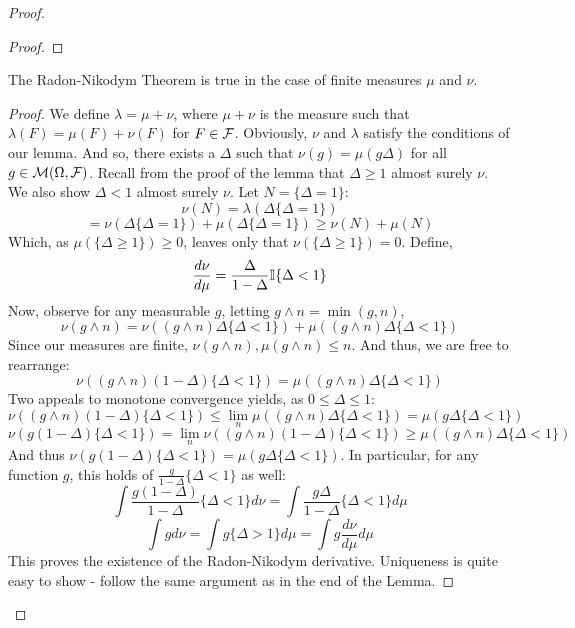 \begin{proof}
\begin{proof}
    \end{proof}

    \begin{lemma} 
        The Radon-Nikodym Theorem is true in the case of finite measures $\mu$ and $\nu$. 
    \end{lemma}

    \begin{proof} 
        We define $\lambda = \mu + \nu$, where $\mu + \nu$ is the measure such that 
        $\lambda(F) = \mu(F) + \nu(F)$ for $F \in \mathcal F$. Obviously, $\nu$ and $\lambda$ satisfy the 
        conditions of our lemma. And so, there exists a $\Delta$ such that $\nu(g) = \mu(g\Delta)$ for all 
        $g \in \mathcal M(\Omega, \mathcal F)$. Recall from the proof of the lemma that $\Delta \geq 1$ almost surely $\nu$. We also show 
        $\Delta < 1$ almost surely $\nu$. Let $N= \{\Delta = 1\}$:
        \[ \nu(N) = \lambda(\Delta\{\Delta = 1\}) \] 
        \[ = \nu(\Delta\{\Delta = 1\}) + \mu(\Delta\{\Delta = 1\}) \geq \nu(N) + \mu(N) \]
        Which, as $\mu(\{\Delta \geq 1\}) \geq 0$, leaves only that $\nu(\{\Delta \geq 1\}) = 0$. Define, 
        \[ \frac{d\nu}{d\mu} = \frac{\Delta}{1-\Delta}\mathbb I\{\Delta < 1\} \]
        Now, observe for any measurable $g$, letting $g \wedge n = \min(g,n)$, 
        \[ \nu(g \wedge n) = \nu((g \wedge n) \Delta \{\Delta < 1\}) + \mu((g \wedge n) \Delta \{\Delta < 1\}) \]
        Since our measures are finite, $\nu(g \wedge n), \mu(g \wedge n) \leq n$. And thus, we are free to rearrange:
        \[ \nu((g \wedge n) (1 - \Delta)\{\Delta < 1\}) = \mu((g \wedge n) \Delta\{\Delta < 1\}) \]
        Two appeals to monotone convergence yields, as $0 \leq \Delta \leq 1$:
        \[ \nu((g \wedge n) (1 - \Delta)\{\Delta < 1\}) \leq \lim_n \mu((g \wedge n) \Delta\{\Delta < 1\}) = \mu(g \Delta\{\Delta < 1\}) \]
        \[\nu(g(1-\Delta)\{\Delta < 1\}) =  \lim_n \nu((g \wedge n) (1 - \Delta)\{\Delta < 1\}) \geq \mu((g \wedge n) \Delta\{\Delta < 1\}) \]
        And thus $\nu(g(1-\Delta)\{\Delta < 1\}) = \mu(g\Delta\{\Delta < 1\})$. In particular, 
        for any function $g$, this holds of $\frac{g}{1-\Delta}\{\Delta < 1\}$ as well:
        \[ \int  \frac{g(1-\Delta)}{1-\Delta}\{\Delta < 1\}d\nu = \int \frac{g\Delta}{1-\Delta}\{\Delta < 1\}d\mu \]
        \[  \int g d\nu = \int g \{\Delta > 1\} d\mu = \int g \frac{d\nu}{d\mu}d\mu \]
        This proves the existence of the Radon-Nikodym derivative. Uniqueness is quite easy to show - follow the same argument 
        as in the end of the Lemma. 

    \end{proof}


\end{proof}
